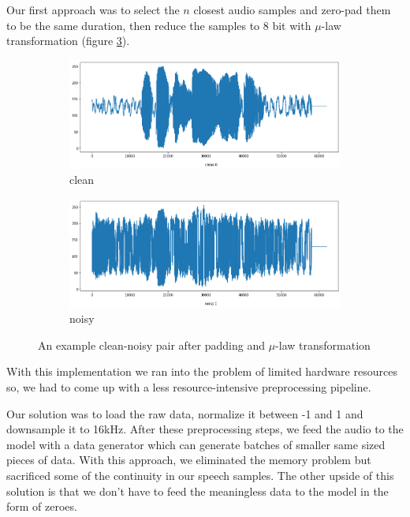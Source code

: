 \documentclass{article}
\begin{document}
	Our first approach was to select the $n$ closest audio samples and zero-pad them to be the same duration, then reduce the samples to 8 bit with $\mu$-law transformation (figure \ref{fig:clean_noisy_padded_mulaw}).
	
	\begin{figure}[H]
		\centering
		\begin{subfigure}{.5\textwidth}
			\centering
			\includegraphics[width=.8\linewidth]{wave_clean_padded_mulaw}
			\caption{clean}
			\label{fig:wave_clean_padded_mulaw}
		\end{subfigure}%
		\begin{subfigure}{.5\textwidth}
			\centering
			\includegraphics[width=.8\linewidth]{wave_noisy_padded_mulaw}
			\caption{noisy}
			\label{fig:wave_noisy_padded_mulaw}
		\end{subfigure}
		\caption{An example clean-noisy pair after padding and $\mu$-law transformation}
		\label{fig:clean_noisy_padded_mulaw}
	\end{figure}
	
	With this implementation we ran into the problem of limited hardware resources so, we had to come up with a less resource-intensive preprocessing pipeline.
	
	Our solution was to load the raw data, normalize it between -1 and 1 and downsample it to 16kHz. After these preprocessing steps, we feed the audio to the model with a data generator which can generate batches of smaller same sized pieces of data.
	With this approach, we eliminated the memory problem but sacrificed some of the continuity in our speech samples. The other upside of this solution is that we don't have to feed the meaningless data to the model in the form of zeroes.
	
\end{document}
